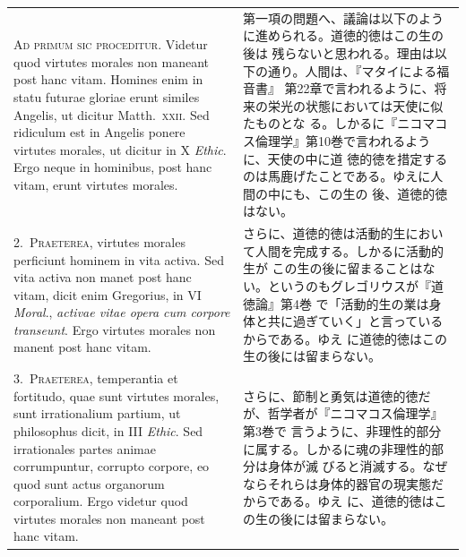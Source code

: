 \documentclass[paper=a4paper,fontsize=10pt,jafontsize=9pt,titlepage]{jlreq}
\begin{document}
\begin{longtable}{p{21em}p{21em}}
 {\scshape Ad primum sic proceditur}. Videtur quod virtutes morales
 non maneant post hanc vitam. Homines enim in statu futurae gloriae
 erunt similes Angelis, ut dicitur Matth.~{\scshape xxii}. Sed
 ridiculum est in Angelis ponere virtutes morales, ut dicitur in X
 {\itshape Ethic}. Ergo neque in hominibus, post hanc vitam, erunt
 virtutes morales.
 
&

 第一項の問題へ、議論は以下のように進められる。道徳的徳はこの生の後は
 残らないと思われる。理由は以下の通り。人間は、『マタイによる福音書』
 第22章で言われるように、将来の栄光の状態においては天使に似たものとな
 る。しかるに『ニコマコス倫理学』第10巻で言われるように、天使の中に道
 徳的徳を措定するのは馬鹿げたことである。ゆえに人間の中にも、この生の
 後、道徳的徳はない。

\\





2.~{\scshape Praeterea}, virtutes morales perficiunt hominem in vita
activa. Sed vita activa non manet post hanc vitam, dicit enim
Gregorius, in VI {\itshape Moral}., {\itshape activae vitae opera cum
corpore transeunt}. Ergo virtutes morales non manent post hanc vitam.
 
&

 さらに、道徳的徳は活動的生において人間を完成する。しかるに活動的生が
 この生の後に留まることはない。というのもグレゴリウスが『道徳論』第4巻
 で「活動的生の業は身体と共に過ぎていく」と言っているからである。ゆえ
 に道徳的徳はこの生の後には留まらない。

\\





3.~{\scshape Praeterea}, temperantia et fortitudo, quae sunt virtutes
morales, sunt irrationalium partium, ut philosophus dicit, in III
{\itshape Ethic}. Sed irrationales partes animae corrumpuntur,
corrupto corpore, eo quod sunt actus organorum corporalium. Ergo
videtur quod virtutes morales non maneant post hanc vitam.
 
&

 さらに、節制と勇気は道徳的徳だが、哲学者が『ニコマコス倫理学』第3巻で
 言うように、非理性的部分に属する。しかるに魂の非理性的部分は身体が滅
 びると消滅する。なぜならそれらは身体的器官の現実態だからである。ゆえ
 に、道徳的徳はこの生の後には留まらない。


\end{longtable}
\end{document}
